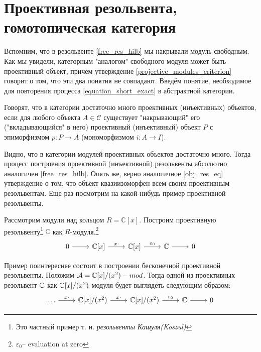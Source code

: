 \documentclass[../main.tex]{subfiles}
\begin{document}
\section{Проективная резольвента, гомотопическая категория}
Вспомним, что в резольвенте \eqref{free_res_hilb} мы накрывали модуль свободным. Как мы увидели, категорным "аналогом" свободного модуля может быть проективный объект, причем утверждение \ref{projective_modules_criterion} говорит о том, что эти два понятия не совпадают. Введём понятие, необходимое для повторения процесса \eqref{equation_short_exact} в абстрактной категории.
\begin{to_def}
Говорят, что в категории достаточно много проективных (инъективных) объектов, если для любого объекта $A\in \mathcal{C}$ существует "накрывающий" его ("вкладывающийся" в него) проективный (инъективный) объект $P$ с эпиморфизмом $p:P \to A$ (мономорфизмом $i:A\to I$).
\end{to_def}
Видно, что в категории модулей проективных объектов достаточно много. Тогда процесс построения проективной (инъективной) резольвенты абсолютно аналогичен \eqref{free_res_hilb}. Опять же, верно аналогичное \ref{obj_res_eq} утверждение о том, что объект квазиизоморфен всем своим проективным резольвентам. Еще раз посмотрим на какой-нибудь пример проективной резольвенты.
\begin{to_ex}
Рассмотрим модули над кольцом $R=\mathbb{C}[x]$. Построим проективную резольвенту\footnote{Это частный пример т. н. \emph{резольвенты Кашуля(Koszul)}} $\mathbb{C}$ как $R$-модуля.\footnote{$\varepsilon_0$-- evaluation at zero}
\begin{equation*}
    \begin{tikzcd}
	0 & {\mathbb{C}[x]} & {\mathbb{C}[x]} & \mathbb{C} & 0
	\arrow[from=1-1, to=1-2]
	\arrow["x\cdot", from=1-2, to=1-3]
	\arrow["\varepsilon_0",from=1-3, to=1-4]
	\arrow[from=1-4, to=1-5]
\end{tikzcd}
\end{equation*}
\end{to_ex}
\begin{to_ex}
Пример поинтереснее состоит в построении бесконечной проективной резольвенты. Положим $\mathcal{A} = \mathbb{C}[x]/(x^2)-mod$. Тогда одной из проективных резольвент $\mathbb{C}$ как $\mathbb{C}[x]/(x^2)$-модуля будет выглядеть следующим образом:
\begin{equation*}
    \begin{tikzcd}
	\ldots & {\C[x]/(x^2)} & {\C[x]/(x^2)} & \C & 0
	\arrow["x\cdot", from=1-1, to=1-2]
	\arrow["x\cdot", from=1-2, to=1-3]
	\arrow["\varepsilon_0", from=1-3, to=1-4]
	\arrow[from=1-4, to=1-5]
\end{tikzcd}
\end{equation*}
\end{to_ex}
\end{document}
